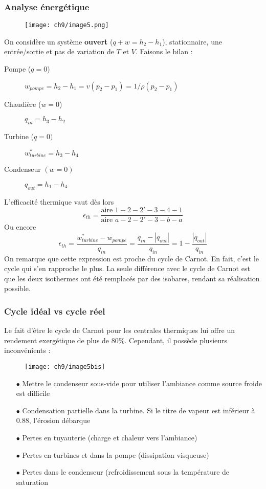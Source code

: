 		\subsubsection{Analyse énergétique}
		\begin{wrapfigure}[8]{r}{4cm}
		\vspace{-5mm}
		\texttt{[image: ch9/image5.png]}
		\end{wrapfigure}
		On considère un système \textbf{ouvert} ($q+w = h_2-h_1$), stationnaire, 
		une entrée/sortie et pas de variation de $T$ et $V$. Faisons le bilan :
		\begin{description}
		\item[Pompe ($q=0$)] $w_{pompe} = h_2-h_1 = v(p_2-p_1)=1/\rho(p_2-p_1)$
		\item[Chaudière ($w=0$)] $q_{in} = h_3-h_2$
		\item[Turbine ($q=0)$] $w_{turbine}^* = h_3-h_4$
		\item[Condenseur $(w=0)$] $q_{out} = h_1-h_4$
		\end{description}
		L’efficacité thermique vaut dès lors 
		\begin{equation}
		\epsilon_{th} = \dfrac{\text{aire } 1-2-2'-3-4-1}{\text{aire } a-2-2'-3-b-a}
		\end{equation}
		Ou encore 
		\begin{equation}
		\epsilon_{th} = \dfrac{w_{turbine}^*-w_{pompe}}{q_{in}} = \dfrac{q_{in}-|q_{out}|}{
		q_{in}} = 1-\dfrac{|q_{out}|}{q_{in}}
		\end{equation}
		On remarque que cette expression est proche du cycle de Carnot. En fait, c'est 
		le cycle qui s'en rapproche le plus. La seule différence avec le cycle de Carnot 
		est que les deux isothermes ont été remplacés par des isobares, rendant sa 
		réalisation possible. 
		
		\newpage
		\subsubsection{Cycle idéal vs cycle réel}
		Le fait d’être le cycle de Carnot pour les centrales thermiques lui offre un 
		rendement exergétique de plus de 80\%. Cependant, il possède plusieurs 
		inconvénients :\\
		\begin{wrapfigure}[8]{r}{5cm}
			\texttt{[image: ch9/image5bis]}
		\end{wrapfigure}
		\begin{itemize}
		\item[$\bullet$] Mettre le condenseur sous-vide pour utiliser l'ambiance 
		comme source froide est difficile
		\item[$\bullet$] Condensation partielle dans la turbine. Si le titre de 
		vapeur est inférieur à 0.88, l’érosion débarque
		\item[$\bullet$] Pertes en tuyauterie (charge et chaleur vers l'ambiance)
		\item[$\bullet$] Pertes en turbines et dans la pompe (dissipation visqueuse)
		\item[$\bullet$] Pertes dans le condenseur (refroidissement sous la température de saturation
		\end{itemize}
